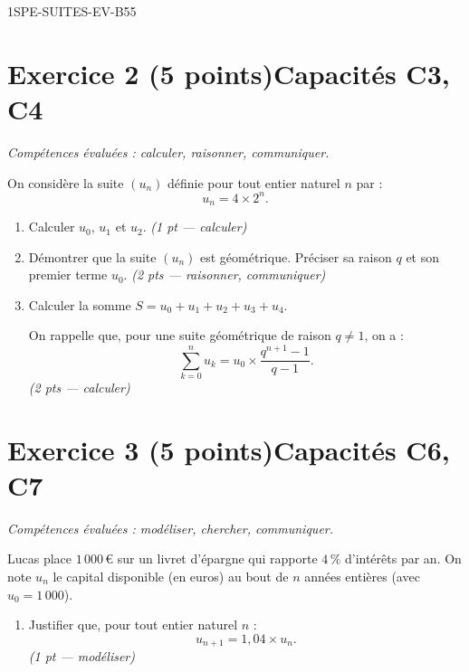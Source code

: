 \begin{evaluation}{1SPE-SUITES-EV-B}{55}
\section*{Exercice 2 \ifnxVersionProfesseur\hfill (5 points)\fi \hfill Capacités C3, C4}

\textit{Compétences évaluées : calculer, raisonner, communiquer.}

\medskip
On considère la suite $(u_n)$ définie pour tout entier naturel $n$ par :
\[
  u_n = 4 \times 2^n.
\]

\begin{enumerate}
  \item Calculer $u_0$, $u_1$ et $u_2$.
  \ifnxVersionProfesseur\hfill\textit{(1 pt — calculer)}\fi

  \item Démontrer que la suite $(u_n)$ est géométrique. Préciser sa raison $q$ et son premier terme $u_0$.
  \ifnxVersionProfesseur\hfill\textit{(2 pts — raisonner, communiquer)}\fi

  \item Calculer la somme $S = u_0 + u_1 + u_2 + u_3 + u_4$.

  On rappelle que, pour une suite géométrique de raison $q
\neq 1$, on a :
  \[
    \sum_{k=0}^{n} u_k = u_0 \times \frac{q^{n+1} - 1}{q - 1}.
  \]
  \ifnxVersionProfesseur\hfill\textit{(2 pts — calculer)}\fi
\end{enumerate}

\section*{Exercice 3 \ifnxVersionProfesseur\hfill (5 points)\fi \hfill Capacités C6, C7}

\textit{Compétences évaluées : modéliser, chercher, communiquer.}

\medskip
Lucas place $1\,000$\,€ sur un livret d'épargne qui rapporte $4\,\%$ d'intérêts par an. On note $u_n$ le capital disponible (en euros) au bout de $n$ années entières (avec $u_0 = 1\,000$).

\begin{enumerate}
  \item Justifier que, pour tout entier naturel $n$ :
  \[
    u_{n+1} = 1{,}04 \times u_n.
  \]
  \ifnxVersionProfesseur\hfill\textit{(1 pt — modéliser)}\fi


\end{enumerate}
\end{evaluation}
